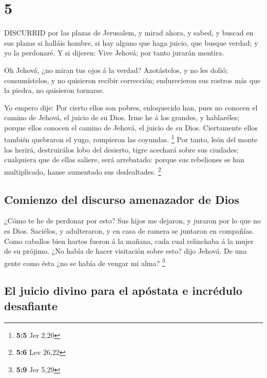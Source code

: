 \hypertarget{section-4}{%
\section{5}\label{section-4}}

 DISCURRID por las plazas de Jerusalem, y mirad ahora, y
sabed, y buscad en sus plazas si halláis hombre, si hay alguno que haga
juicio, que busque verdad; y yo la perdonaré.  Y si dijeren:
Vive Jehová; por tanto jurarán mentira.

 Oh Jehová, ¿no miran tus ojos á la verdad? Azotástelos, y
no les dolió; consumístelos, y no quisieron recibir corrección;
endurecieron sus rostros más que la piedra, no quisieron tornarse.

 Yo empero dije: Por cierto ellos son pobres, enloquecido
han, pues no conocen el camino de Jehová, el juicio de su Dios.
 Irme he á los grandes, y hablaréles; porque ellos conocen
el camino de Jehová, el juicio de su Dios. Ciertamente ellos también
quebraron el yugo, rompieron las coyundas. \footnote{\textbf{5:5} Jer
  2,20}  Por tanto, león del monte los herirá, destruirálos
lobo del desierto, tigre acechará sobre sus ciudades; cualquiera que de
ellas saliere, será arrebatado: porque sus rebeliones se han
multiplicado, hanse aumentado sus deslealtades. \footnote{\textbf{5:6}
  Lev 26,22}

\hypertarget{comienzo-del-discurso-amenazador-de-dios}{%
\subsection{Comienzo del discurso amenazador de
Dios}\label{comienzo-del-discurso-amenazador-de-dios}}

 ¿Cómo te he de perdonar por esto? Sus hijos me dejaron, y
juraron por lo que no es Dios. Saciélos, y adulteraron, y en casa de
ramera se juntaron en compañías.  Como caballos bien hartos
fueron á la mañana, cada cual relinchaba á la mujer de su prójimo.
 ¿No había de hacer visitación sobre esto? dijo Jehová. De
una gente como ésta ¿no se había de vengar mi alma? \footnote{\textbf{5:9}
  Jer 5,29}

\hypertarget{el-juicio-divino-para-el-apuxf3stata-e-incruxe9dulo-desafiante}{%
\subsection{El juicio divino para el apóstata e incrédulo
desafiante}\label{el-juicio-divino-para-el-apuxf3stata-e-incruxe9dulo-desafiante}}

